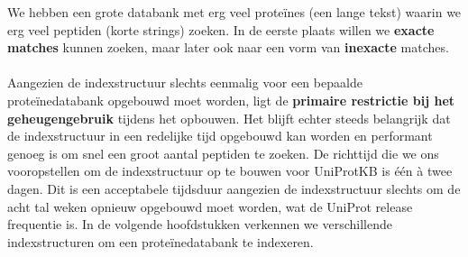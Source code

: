 We hebben een grote databank met erg veel proteïnes (een lange tekst) waarin we erg veel peptiden (korte strings) zoeken.
In de eerste plaats willen we \textbf{exacte matches} kunnen zoeken, maar later ook naar een vorm van \textbf{inexacte} matches.
\\ \\
Aangezien de indexstructuur slechts eenmalig voor een bepaalde proteïnedatabank opgebouwd moet worden, ligt de \textbf{primaire restrictie bij het geheugengebruik} tijdens het opbouwen.
Het blijft echter steeds belangrijk dat de indexstructuur in een redelijke tijd opgebouwd kan worden en performant genoeg is om snel een groot aantal peptiden te zoeken.
De richttijd die we ons vooropstellen om de indexstructuur op te bouwen voor UniProtKB is één à twee dagen.
Dit is een acceptabele tijdsduur aangezien de indexstructuur slechts om de acht tal weken opnieuw opgebouwd moet worden, wat de UniProt release frequentie is.
In de volgende hoofdstukken verkennen we verschillende indexstructuren om een proteïnedatabank te indexeren.


